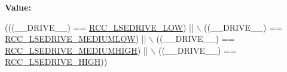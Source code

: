 {\bfseries Value\+:}
\begin{DoxyCode}
(((\_\_DRIVE\_\_) == \hyperlink{group___r_c_c_ex___l_s_e_drive___configuration_gab5fa5b50304710db2d7f6d583a225da3}{RCC\_LSEDRIVE\_LOW})        || \(\backslash\)
                                     ((\_\_DRIVE\_\_) == \hyperlink{group___r_c_c_ex___l_s_e_drive___configuration_ga1151beb7f9869e91fe7617936ad0efff}{RCC\_LSEDRIVE\_MEDIUMLOW})  || \(\backslash\)
                                     ((\_\_DRIVE\_\_) == \hyperlink{group___r_c_c_ex___l_s_e_drive___configuration_ga295eed1e1368d526fa0f6356ceecbc48}{RCC\_LSEDRIVE\_MEDIUMHIGH}) || \(\backslash\)
                                     ((\_\_DRIVE\_\_) == \hyperlink{group___r_c_c_ex___l_s_e_drive___configuration_ga90b0854f3813d7ab2781519bfa58fd95}{RCC\_LSEDRIVE\_HIGH}))
\end{DoxyCode}
